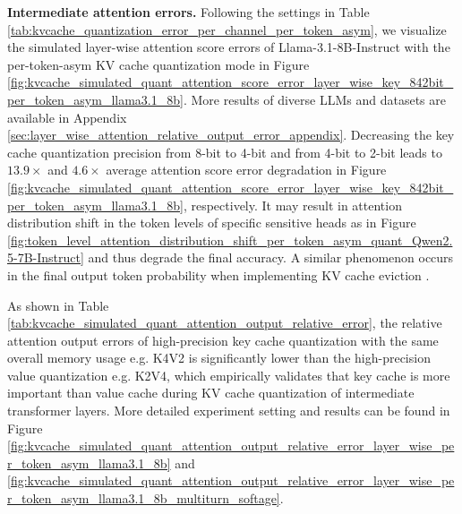 \textbf{Intermediate attention errors.} Following the settings in Table \ref{tab:kvcache_quantization_error_per_channel_per_token_asym}, we visualize the simulated layer-wise attention score errors of Llama-3.1-8B-Instruct with the per-token-asym KV cache quantization mode in Figure \ref{fig:kvcache_simulated_quant_attention_score_error_layer_wise_key_842bit_per_token_asym_llama3.1_8b}. More results of diverse LLMs and datasets are available in Appendix \ref{sec:layer_wise_attention_relative_output_error_appendix}. Decreasing the key cache quantization precision from 8-bit to 4-bit and from 4-bit to 2-bit leads to $13.9\times$ and $4.6\times$ average attention score error degradation in Figure \ref{fig:kvcache_simulated_quant_attention_score_error_layer_wise_key_842bit_per_token_asym_llama3.1_8b}, respectively. It may result in attention distribution shift in the token levels of specific sensitive heads as in Figure \ref{fig:token_level_attention_distribution_shift_per_token_asym_quant_Qwen2.5-7B-Instruct} and thus degrade the final accuracy. A similar phenomenon occurs in the final output token probability when implementing KV cache eviction \cite{adnan2024keyformer}. 

As shown in Table \ref{tab:kvcache_simulated_quant_attention_output_relative_error}, the relative attention output errors of high-precision key cache quantization with the same overall memory usage e.g. K4V2 is significantly lower than the high-precision value quantization e.g. K2V4, which empirically validates that key cache is more important than value cache during KV cache quantization of intermediate transformer layers. More detailed experiment setting and results can be found in Figure \ref{fig:kvcache_simulated_quant_attention_output_relative_error_layer_wise_per_token_asym_llama3.1_8b} and \ref{fig:kvcache_simulated_quant_attention_output_relative_error_layer_wise_per_token_asym_llama3.1_8b_multiturn_softage}.

\begin{table}
    \centering
    \caption{Layer-wise relative attention output error ($e_o$) of per-token-asym KV Quant. method on Llama-3.1-8B-Instruct on the first 20 prompts from the GSM8K dataset.}
    \label{tab:kvcache_simulated_quant_attention_output_relative_error}
\end{table}

